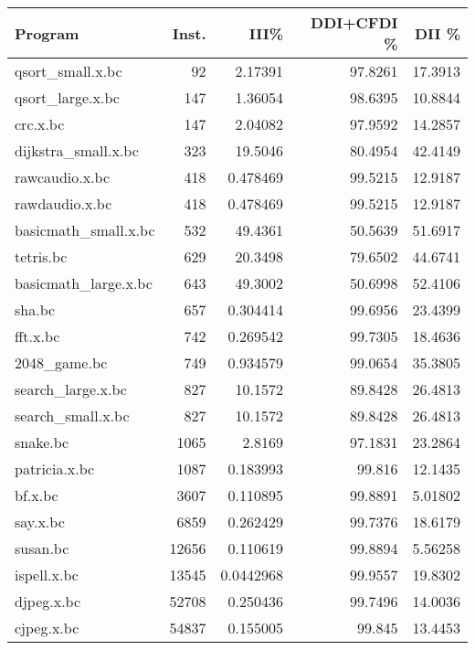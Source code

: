 \begin{tabular}{lrrrr}
\hline
 Program              &   Inst. &       III\% &   DDI+CFDI \% &    DII \% \\
\hline
 qsort\_small.x.bc     &      92 &  2.17391   &      97.8261 & 17.3913  \\
 qsort\_large.x.bc     &     147 &  1.36054   &      98.6395 & 10.8844  \\
 crc.x.bc             &     147 &  2.04082   &      97.9592 & 14.2857  \\
 dijkstra\_small.x.bc  &     323 & 19.5046    &      80.4954 & 42.4149  \\
 rawcaudio.x.bc       &     418 &  0.478469  &      99.5215 & 12.9187  \\
 rawdaudio.x.bc       &     418 &  0.478469  &      99.5215 & 12.9187  \\
 basicmath\_small.x.bc &     532 & 49.4361    &      50.5639 & 51.6917  \\
 tetris.bc            &     629 & 20.3498    &      79.6502 & 44.6741  \\
 basicmath\_large.x.bc &     643 & 49.3002    &      50.6998 & 52.4106  \\
 sha.bc               &     657 &  0.304414  &      99.6956 & 23.4399  \\
 fft.x.bc             &     742 &  0.269542  &      99.7305 & 18.4636  \\
 2048\_game.bc         &     749 &  0.934579  &      99.0654 & 35.3805  \\
 search\_large.x.bc    &     827 & 10.1572    &      89.8428 & 26.4813  \\
 search\_small.x.bc    &     827 & 10.1572    &      89.8428 & 26.4813  \\
 snake.bc             &    1065 &  2.8169    &      97.1831 & 23.2864  \\
 patricia.x.bc        &    1087 &  0.183993  &      99.816  & 12.1435  \\
 bf.x.bc              &    3607 &  0.110895  &      99.8891 &  5.01802 \\
 say.x.bc             &    6859 &  0.262429  &      99.7376 & 18.6179  \\
 susan.bc             &   12656 &  0.110619  &      99.8894 &  5.56258 \\
 ispell.x.bc          &   13545 &  0.0442968 &      99.9557 & 19.8302  \\
 djpeg.x.bc           &   52708 &  0.250436  &      99.7496 & 14.0036  \\
 cjpeg.x.bc           &   54837 &  0.155005  &      99.845  & 13.4453  \\

\end{tabular}
